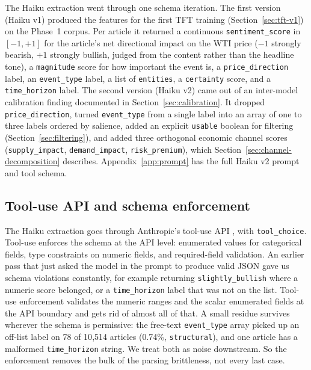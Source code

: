 The Haiku extraction went through one schema iteration. The first version (Haiku v1) produced the features for the first TFT training (Section~\ref{sec:tft-v1}) on the Phase~1 corpus. Per article it returned a continuous \texttt{sentiment\_score} in $[-1, +1]$ for the article's net directional impact on the WTI price ($-1$ strongly bearish, $+1$ strongly bullish, judged from the content rather than the headline tone), a \texttt{magnitude} score for how important the event is, a \texttt{price\_direction} label, an \texttt{event\_type} label, a list of \texttt{entities}, a \texttt{certainty} score, and a \texttt{time\_horizon} label. The second version (Haiku v2) came out of an inter-model calibration finding documented in Section~\ref{sec:calibration}. It dropped \texttt{price\_direction}, turned \texttt{event\_type} from a single label into an array of one to three labels ordered by salience, added an explicit \texttt{usable} boolean for filtering (Section~\ref{sec:filtering}), and added three orthogonal economic channel scores (\texttt{supply\_impact}, \texttt{demand\_impact}, \texttt{risk\_premium}), which Section~\ref{sec:channel-decomposition} describes. Appendix~\ref{app:prompt} has the full Haiku v2 prompt and tool schema.

\subsection{Tool-use API and schema enforcement}\label{sec:tool-use}

The Haiku extraction goes through Anthropic's tool-use API \citep{anthropic_tooluse}, with \texttt{tool\_choice}. Tool-use enforces the schema at the API level: enumerated values for categorical fields, type constraints on numeric fields, and required-field validation. An earlier pass that just asked the model in the prompt to produce valid JSON gave us schema violations constantly, for example returning \texttt{slightly\_bullish} where a numeric score belonged, or a \texttt{time\_horizon} label that was not on the list. Tool-use enforcement validates the numeric ranges and the scalar enumerated fields at the API boundary and gets rid of almost all of that. A small residue survives wherever the schema is permissive: the free-text \texttt{event\_type} array picked up an off-list label on 78 of 10{,}514 articles (0.74\%, \texttt{structural}), and one article has a malformed \texttt{time\_horizon} string. We treat both as noise downstream. So the enforcement removes the bulk of the parsing brittleness, not every last case.

